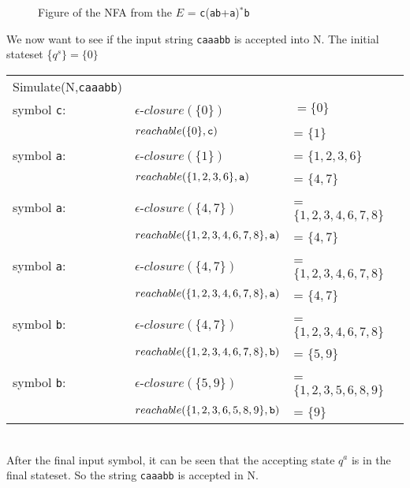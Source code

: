 \begin{myex}
\begin{figure}[h!]
\begin{center}
  \end{center}
  \caption{Figure of the NFA from the $E$ = {\tt c}({\tt ab}+{\tt a})$^*${\tt b}}
  \label{nfasimsucc}
\end{figure}
We now want to see if the input string {\tt caaabb} is accepted into N. The initial stateset \{$q^s\}=\{0\}$ \\
\begin{tabular}{l l l}
Simulate(N,{\tt caaabb}) & & \\
symbol {\tt c}: & $\epsilon$-$closure(\{0\})$ &$ = \{0\}$\\
&$reachable(\{0\},{\tt c})$& = $\{1\}$\\
symbol {\tt a}: & $\epsilon$-$closure(\{1\})$& = $\{1,2,3,6\}$\\
&$reachable(\{1,2,3,6\},{\tt a})$ & = $\{4,7\}$\\
symbol {\tt a}: & $\epsilon$-$closure(\{4,7\})$& = $\{1,2,3,4,6,7,8\}$\\
&$reachable(\{1,2,3,4,6,7,8\},{\tt a})$ &= $\{4,7\}$\\
symbol {\tt a}: & $\epsilon$-$closure(\{4,7\})$& = $\{1,2,3,4,6,7,8\}$\\
&$reachable(\{1,2,3,4,6,7,8\},{\tt a})$ &= $\{4,7\}$\\
symbol {\tt b}: & $\epsilon$-$closure(\{4,7\})$& = $\{1,2,3,4,6,7,8\}$\\
&$reachable(\{1,2,3,4,6,7,8\},{\tt b})$ &= $\{5,9\}$\\
symbol {\tt b}: & $\epsilon$-$closure(\{5,9\})$& = $\{1,2,3,5,6,8,9\}$\\
&$reachable(\{1,2,3,6,5,8,9\},{\tt b})$ &= $\{9\}$\\
\end{tabular}\\
After the final input symbol, it can be seen that the accepting state $q^a$ is in the final stateset. So the string {\tt caaabb} is accepted in N.
\end{myex}

